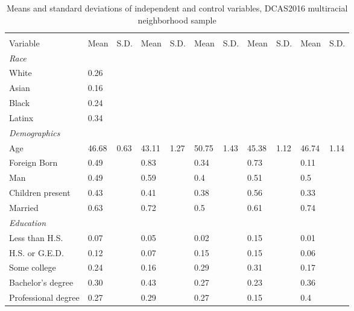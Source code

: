 % 
\begin{sidewaystable}[ht]
\centering
\caption{Means and standard deviations of independent and control variables, DCAS2016 multiracial neighborhood sample} 
\label{descriptives16}
\begin{tabular}{lR{.4in}R{.4in}R{.4in}R{.4in}R{.4in}R{.4in}R{.4in}R{.4in}R{.4in}R{.4in}}
  \toprule
&  &  &  &  &  \\
Variable & Mean & S.D. & Mean & S.D. & Mean & S.D. & Mean & S.D. & Mean & S.D. \\ 
  \midrule
\emph{Race}&&\\White &  0.26 &  &  &  &  &  &  &  &  &  \\ 
  Asian &  0.16 &  &  &  &  &  &  &  &  &  \\ 
  Black &  0.24 &  &  &  &  &  &  &  &  &  \\ 
  Latinx\vspace{1em} &  0.34 &  &  &  &  &  &  &  &  &  \\ 
  \emph{Demographics}&&\\Age & 46.68 & 0.63 & 43.11 & 1.27 & 50.75 & 1.43 & 45.38 & 1.12 & 46.74 & 1.14 \\ 
  Foreign Born &  0.49 &  & 0.83 &  & 0.34 &  & 0.73 &  & 0.11 &  \\ 
  Man &  0.49 &  & 0.59 &  & 0.4 &  & 0.51 &  & 0.5 &  \\ 
  Children present &  0.43 &  & 0.41 &  & 0.38 &  & 0.56 &  & 0.33 &  \\ 
  Married\vspace{1em} &  0.63 &  & 0.72 &  & 0.5 &  & 0.61 &  & 0.74 &  \\ 
  \emph{Education}&&\\Less than H.S. &  0.07 &  & 0.05 &  & 0.02 &  & 0.15 &  & 0.01 &  \\ 
  H.S. or G.E.D. &  0.12 &  & 0.07 &  & 0.15 &  & 0.15 &  & 0.06 &  \\ 
  Some college &  0.24 &  & 0.16 &  & 0.29 &  & 0.31 &  & 0.17 &  \\ 
  Bachelor's degree &  0.30 &  & 0.43 &  & 0.27 &  & 0.23 &  & 0.36 &  \\ 
  Professional degree\vspace{1em} &  0.27 &  & 0.29 &  & 0.27 &  & 0.15 &  & 0.4 &  \\ 

\end{tabular}
\end{sidewaystable}
